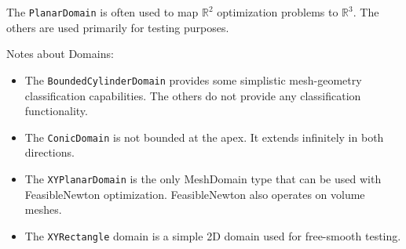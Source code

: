 The \texttt{PlanarDomain} is often used to map $\mathbb{R}^{2}$ optimization
problems to $\mathbb{R}^{3}$.  The others are used primarily for testing
purposes.  

\medskip
\noindent Notes about Domains:
\begin{itemize}
\item The \texttt{BoundedCylinderDomain} provides some simplistic
mesh-geometry classification capabilities.  The others do not provide any
classification functionality. 
\item The \texttt{ConicDomain} is not bounded at the apex.
It extends infinitely in  both directions.
\item The \texttt{XYPlanarDomain} is the only MeshDomain type that can be used with FeasibleNewton optimization.  FeasibleNewton also operates on volume meshes. 
\item The \texttt{XYRectangle} domain is a simple 2D domain used for free-smooth testing.
\end{itemize}
